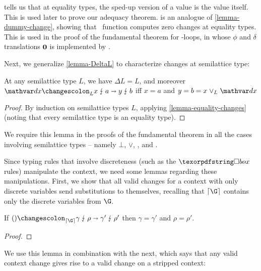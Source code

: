 \noindent
{} tells us that at equality types, the sped-up version
of a value is the value itself. This is used later to prove our adequacy
theorem.
%
 is an analogue of \cref{lemma-dummy-change}, showing that
\dummy\ function computes zero changes at equality types.
%
This is used in the proof of the fundamental theorem for -loops,
in whose $\phi$ and $\delta$ translations $\boldsymbol 0$ is implemented by \dummy.

Next, we generalize \cref{lemma-DeltaL} to characterize changes at semilattice
type:


\begin{lemma}
  At any semilattice type\/ $L$, we have\/ $\Delta L = L$, and moreover\/
  $\weirdat{L}{\dx}{x}{a}{y}{b}$ iff\/ $x = a$ and\/ $y = b = x \vee_L \dx$
\end{lemma}

\begin{proof}
  By induction on semilattice types $L$, applying \cref{lemma-equality-changes}
  (noting that every semilattice type is an equality type).
\end{proof}

\noindent
We require this lemma in the proofs of the fundamental theorem in all the
cases involving semilattice types -- namely $\bot$, ${\vee}$, ,
and .

Since typing rules that involve discreteness (such as the $\iso$ rules)
manipulate the context, we need some lemmas regarding these manipulations.
First, we show that all valid changes for a context with only discrete variables
send substitutions to themselves, recalling that $\stripcx{\G}$ contains only the
discrete variables from $\G$.

\begin{lemma}
  If\/ $\weirdat{\stripcx{\G}}{\tuple{}}{\gamma}{\rho}{\gamma'}{\rho'}$ then\/
  $\gamma = \gamma'$ and\/ $\rho = \rho'$.
\end{lemma}

\begin{proof}
\end{proof}

\noindent
We use this lemma in combination with the next, which says that any valid
context change gives rise to a valid change on a stripped context:

